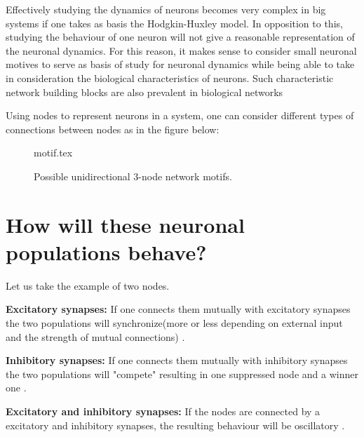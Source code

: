 \documentclass[class={myRUCProject}, crop=false]{standalone}
\begin{document}
\indent Effectively studying the dynamics of neurons becomes very complex in big systems if one takes as basis the Hodgkin-Huxley model. In opposition to this, studying the behaviour of one neuron will not give a reasonable representation of the neuronal dynamics. For this reason, it makes sense to consider small neuronal motives to serve as basis of study for neuronal dynamics while being able to take in consideration the biological characteristics of neurons. Such characteristic network building blocks are also prevalent in biological networks \cite{Sporns2004}

\indent Using nodes to represent neurons in a system, one can consider different types of connections between nodes as in the figure below:


\begin{figure}[h!]
    \centering
    {motif.tex}
    \caption{ Possible unidirectional 3-node network motifs. \cite{Shadizadeh2022}}
    \label{fig:enter-label}
\end{figure}

\section{How will these neuronal populations behave?}

Let us take the example of two nodes. \newline

\textbf{Excitatory synapses:} If one connects them mutually with excitatory synapses the two populations will synchronize(more or less depending on external input and the strength of mutual connections) \cite{}.

\textbf{Inhibitory synapses:} If one connects them mutually with inhibitory synapses the two populations will "compete" resulting in one suppressed node and a winner one \cite{}.

\textbf{Excitatory and inhibitory synapses:} If the nodes are connected by a excitatory and inhibitory synapses, the resulting behaviour will be oscillatory \cite{}.
\end{document}
